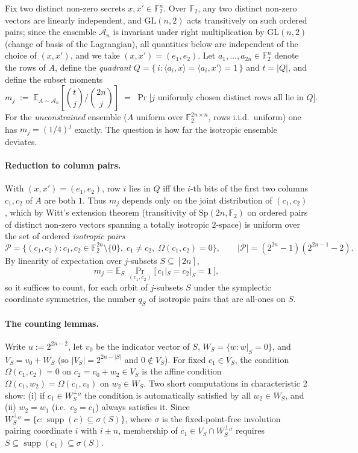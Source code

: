 \documentclass[11pt,a4paper]{article}
\theoremstyle{plain}
\theoremstyle{definition}
\newcommand{\F}{\mathbb{F}}
\newcommand{\E}{\mathbb{E}}
\begin{document}
Fix two distinct non-zero secrets $x, x' \in \F_2^n$. Over $\F_2$, any two distinct non-zero vectors are linearly independent, and $\mathrm{GL}(n,2)$ acts transitively on such ordered pairs; since the ensemble $\mathcal{A}_n$ is invariant under right multiplication by $\mathrm{GL}(n,2)$ (change of basis of the Lagrangian), all quantities below are independent of the choice of $(x,x')$, and we take $(x,x') = (e_1, e_2)$. Let $a_1, \dots, a_{2n} \in \F_2^n$ denote the rows of $A$, define the \emph{quadrant} $Q = \{\, i : \langle a_i, x\rangle = \langle a_i, x'\rangle = 1 \,\}$ and $t = |Q|$, and define the subset moments
\[
m_j \;:=\; \E_{A \sim \mathcal{A}_n}\!\left[\binom{t}{j}\Big/\binom{2n}{j}\right]
\;=\; \Pr\bigl[\text{$j$ uniformly chosen distinct rows all lie in } Q\bigr].
\]
For the \emph{unconstrained} ensemble ($A$ uniform over $\F_2^{2n\times n}$, rows i.i.d.\ uniform) one has $m_j = (1/4)^j$ exactly. The question is how far the isotropic ensemble deviates.

\paragraph{Reduction to column pairs.} With $(x,x')=(e_1,e_2)$, row $i$ lies in $Q$ iff the $i$-th bits of the first two columns $c_1, c_2$ of $A$ are both $1$. Thus $m_j$ depends only on the joint distribution of $(c_1, c_2)$, which by Witt's extension theorem (transitivity of $\mathrm{Sp}(2n,\F_2)$ on ordered pairs of distinct non-zero vectors spanning a totally isotropic $2$-space) is uniform over the set of ordered \emph{isotropic pairs}
\[
\mathcal{P} = \{(c_1,c_2) : c_1, c_2 \in \F_2^{2n}\setminus\{0\},\; c_1 \neq c_2,\; \Omega(c_1,c_2)=0\},
\qquad |\mathcal{P}| = (2^{2n}-1)(2^{2n-1}-2).
\]
By linearity of expectation over $j$-subsets $S \subseteq [2n]$,
\[
m_j = \E_{S}\,\Pr_{(c_1,c_2)}\bigl[\,c_1|_S = c_2|_S = \mathbf{1}\,\bigr],
\]
so it suffices to count, for each orbit of $j$-subsets $S$ under the symplectic coordinate symmetries, the number $q_S$ of isotropic pairs that are all-ones on $S$.

\paragraph{The counting lemmas.} Write $u := 2^{2n-2}$, let $v_0$ be the indicator vector of $S$, $W_S = \{w : w|_S = 0\}$, and $V_S = v_0 + W_S$ (so $|V_S| = 2^{2n-|S|}$ and $0 \notin V_S$). For fixed $c_1 \in V_S$, the condition $\Omega(c_1, c_2) = 0$ on $c_2 = v_0 + w_2 \in V_S$ is the affine condition $\Omega(c_1, w_2) = \Omega(c_1, v_0)$ on $w_2 \in W_S$. Two short computations in characteristic 2 show: (i) if $c_1 \in W_S^{\perp_\Omega}$ the condition is automatically satisfied by all $w_2 \in W_S$, and (ii) $w_2 = w_1$ (i.e.\ $c_2 = c_1$) always satisfies it. Since $W_S^{\perp_\Omega} = \{c : \operatorname{supp}(c) \subseteq \sigma(S)\}$, where $\sigma$ is the fixed-point-free involution pairing coordinate $i$ with $i \pm n$, membership of $c_1 \in V_S \cap W_S^{\perp_\Omega}$ requires $S \subseteq \operatorname{supp}(c_1) \subseteq \sigma(S)$.
\end{document}
